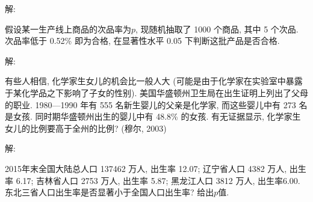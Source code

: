 \documentclass[standard]{ExBook}
\begin{document}
\begin{qitems}
\vspace{-5em}

    \begin{bbox}
解: 
    \end{bbox}

\vspace{-5em}

    \begin{bbox}
    \begin{shaded}
        \qitem
假设某一生产线上商品的次品率为$p$, 现随机抽取了 1000 个商品, 其中 5 个次品. 次品率低于 0.52\% 即为合格, 在显著性水平 0.05 下判断这批产品是否合格.
    \end{shaded}
    \end{bbox}

\vspace{-5em}

    \begin{bbox}
解: 
    \end{bbox}

\vspace{-5em}

    \begin{bbox}
    \begin{shaded}
        \qitem
有些人相信, 化学家生女儿的机会比一般人大 (可能是由于化学家在实验室中暴露于某化学品之下影响了子女的性别). 美国华盛顿州卫生局在出生证明上列出了父母的职业. 1980—1990 年有 555 名新生婴儿的父亲是化学家, 而这些婴儿中有 273 名是女孩. 同时期华盛顿州出生的婴儿中有 48.8\% 的女孩. 有无证据显示, 化学家生女儿的比例要高于全州的比例? (穆尔, 2003)
    \end{shaded}
    \end{bbox}

\vspace{-5em}

    \begin{bbox}
解: 
    \end{bbox}

\vspace{-5em}

    \begin{bbox}
    \begin{shaded}
        \qitem
2015年末全国大陆总人口 137462 万人, 出生率 12.07\textperthousand; 辽宁省人口 4382 万人, 出生率 6.17\textperthousand; 吉林省人口 2753 万人, 出生率 5.87\textperthousand; 黑龙江人口 3812 万人, 出生率6.00\textperthousand. 东北三省人口出生率是否显著小于全国人口出生率? 给出$p$值.
    \end{shaded}
    \end{bbox}


\end{qitems}
\end{document}
